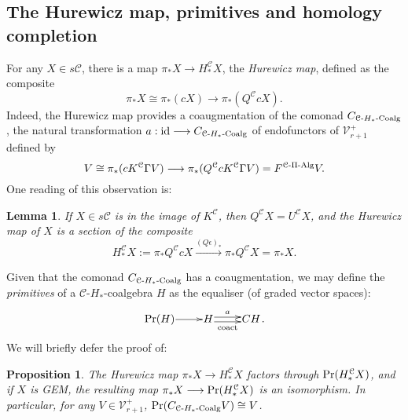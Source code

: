 \documentclass[11pt]{amsart}
\theoremstyle{plain}
\newtheorem{lem}[thm]{Lemma}
\newtheorem{prop}[thm]{Proposition}
\theoremstyle{definition}
\renewcommand{\to}{\longrightarrow}
\newcommand{\calC}{\mathcal{C}}
\newcommand{\calV}{\mathcal{V}}
\newcommand{\calc}{\mathcal{C}}
\theoremstyle{plain}
\newcommand{\vect}[2]{\calV^{#1}_{#2}}
\newcommand{\PiAlg}{\textup{-$\Pi$-Alg}}
\newcommand{\HCoalg}{\textup{-$H_*$-Coalg}}
\newcommand{\Id}{\textup{id}}
\begin{document}
\begin{CPiAlgs and CHalgs}
\subsection{The Hurewicz map, primitives and homology completion}\label{The Hurewicz map, primitives and homology completion}
For any $X\in s\calc$, there is a map $\pi_*X\to H_*^{\calc}X$, the \emph{Hurewicz map}, defined as the composite
\[\pi_*X\cong \pi_*(cX)\to \pi_*(Q^{\calc}cX).\]
Indeed, the Hurewicz map provides a coaugmentation of the comonad $C_{\calc\HCoalg}$, the natural transformation $a:\Id\to C_{\calc\HCoalg}$ of endofunctors of $\vect{+}{r+1}$ defined by
\[V\cong \pi_*(cK^{\calc}\Gamma  V)\to \pi_*(Q^{\calc}cK^{\calc}\Gamma  V)=F^{\calc\PiAlg}V.\]
One reading of this observation is:
\begin{lem}\label{hurewicz is a section}
If $X\in s\calC$ is in the image of $K^\calc$, then $Q^\calc X=U^{\calc}X$, and the Hurewicz map of $X$ is a section of the composite
\[H_*^{\calc}X:=\pi_*Q^{\calc}cX\overset{(Q\epsilon)_*}{\to}\pi_*Q^{\calc}X=\pi_*X.\]
\end{lem}
Given that the comonad $C_{\calc\HCoalg}$ has a coaugmentation, we may define the \emph{primitives} of a $\calc$-$H_*$-coalgebra $H$ as the equaliser (of graded vector spaces):
\[\xymatrix@R=4mm@1{
\textup{Pr}(H)\ar[r]
&%
H\ar@<.5ex>[r]^-{a}
\ar@<-.5ex>[r]_-{\textup{coact}}
&%
CH%
}.\]
We will briefly defer the proof of:
\begin{prop}\label{hurewicz}
The Hurewicz map $\pi_*X\to H_*^{\calc}X$ factors through $\textup{Pr}(H_*^{\calc}X)$, and if $X$ is GEM, the resulting map $\pi_*X\to\textup{Pr}(H_*^\calc X)$ is an isomorphism. In particular, for any $V\in\vect{+}{r+1}$, $\textup{Pr}(C_{\calc\HCoalg}V)\cong V$.
\end{prop}


\end{CPiAlgs and CHalgs}
\end{document}
